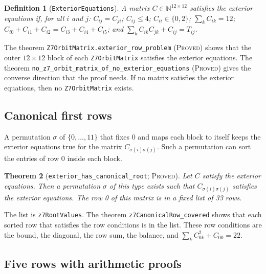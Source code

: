 \documentclass[pdflatex,sn-mathphys-num]{sn-jnl}
\theoremstyle{thmstyleone}
\newtheorem{theorem}{Theorem}[section]
\theoremstyle{thmstyletwo}
\theoremstyle{thmstylethree}
\newtheorem{definition}[theorem]{Definition}
\numberwithin{equation}{section}
\begin{document}
\begin{definition}[\texttt{ExteriorEquations}]
A matrix $C \in \mathbb{N}^{12 \times 12}$ satisfies the exterior equations if, for all $i$ and $j$:
$C_{ij} = C_{ji}$; $C_{ij} \le 4$; $C_{ii} \in \{0, 2\}$; $\sum_k C_{ik} = 12$; $C_{i0} + C_{i1} + C_{i2} = C_{i3} + C_{i4} + C_{i5}$; and $\sum_k C_{ik} C_{jk} + C_{ij} = T_{ij}$.
\end{definition}

The theorem \texttt{Z7OrbitMatrix.exterior\_row\_problem} (\textsc{Proved}) shows that the outer $12 \times 12$ block of each \texttt{Z7OrbitMatrix} satisfies the exterior equations.
The theorem \texttt{no\_z7\_orbit\_matrix\_of\_no\_exterior\_equations} (\textsc{Proved}) gives the converse direction that the proof needs. If no matrix satisfies the exterior equations, then no \texttt{Z7OrbitMatrix} exists.

\subsection{Canonical first rows}

A permutation $\sigma$ of $\{0, \dots, 11\}$ that fixes 0 and maps each block to itself keeps the exterior equations true for the matrix $C_{\sigma(i)\sigma(j)}$.
Such a permutation can sort the entries of row 0 inside each block.

\begin{theorem}[\texttt{exterior\_has\_canonical\_root}; \textsc{Proved}]
Let $C$ satisfy the exterior equations. Then a permutation $\sigma$ of this type exists such that $C_{\sigma(i)\sigma(j)}$ satisfies the exterior equations. The row 0 of this matrix is in a fixed list of 33 rows.
\end{theorem}

The list is \texttt{z7RootValues}. The theorem \texttt{z7CanonicalRow\_covered} shows that each sorted row that satisfies the row conditions is in the list. These row conditions are the bound, the diagonal, the row sum, the balance, and $\sum_k C_{0k}^2 + C_{00} = 22$.

\subsection{Five rows with arithmetic proofs}
\end{document}
